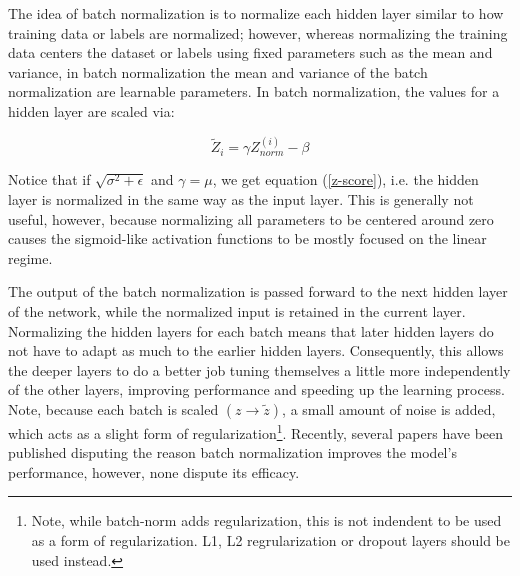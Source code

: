 The idea of batch normalization is to normalize each hidden layer similar to how training data or labels are normalized; however, whereas normalizing the training data centers the dataset or labels using fixed parameters such as the mean and variance, in batch normalization the mean and variance of the batch normalization are learnable parameters. In batch normalization, the values for a hidden layer are scaled via:

\begin{equation}
\widetilde{Z}_i = \gamma Z_{norm}^{(i)} - \beta
\end{equation}

\noindent Notice that if $\sqrt{\sigma^2 + \epsilon}$ and $\gamma = \mu$, we get equation (\ref{z-score}), i.e. the hidden layer is normalized in the same way as the input layer. This is generally not useful, however, because normalizing all parameters to be centered around zero causes the sigmoid-like activation functions to be mostly focused on the linear regime.



The output of the batch normalization is passed forward to the next hidden layer of the network, while the normalized input is retained in the current layer. Normalizing the hidden layers for each batch means that later hidden layers do not have to adapt as much to the earlier hidden layers. Consequently, this allows the deeper layers to do a better job tuning themselves a little more independently of the other layers, improving performance and speeding up the learning process. Note, because each batch is scaled $(z \rightarrow \widetilde{z})$, a small amount of noise is added, which acts as a slight form of regularization\footnote{Note, while batch-norm adds regularization, this is not indendent to be used as a form of regularization. L1, L2 regrularization or dropout layers should be used instead.}. Recently, several papers  \cite{whybatchnorm1} \cite{whybatchnorm2} \cite{whybatchnorm3} have been published disputing the reason batch normalization improves the model's performance, however, none dispute its efficacy. 

